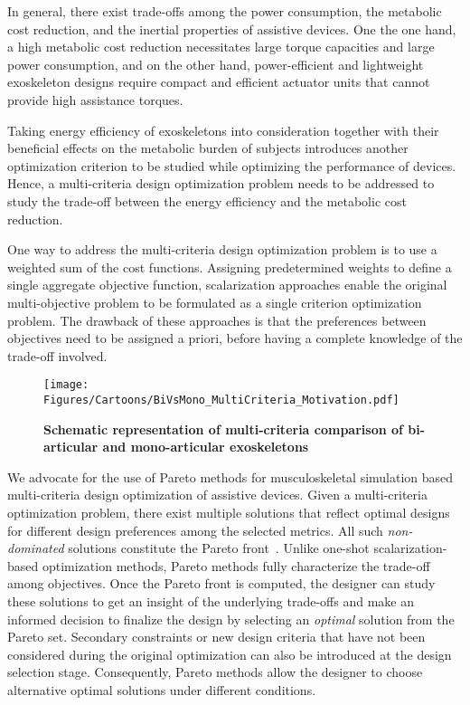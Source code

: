 \documentclass[10pt,letterpaper]{article}
\begin{document}
In general, there exist  trade-offs among the power consumption, the metabolic cost reduction, and the inertial properties of assistive devices. One the one hand, a high metabolic cost reduction necessitates large torque capacities and large power consumption, and on the other hand, power-efficient and lightweight exoskeleton designs require compact and efficient actuator units that cannot provide high assistance torques.

Taking energy efficiency of exoskeletons into consideration together with their beneficial effects on the metabolic burden of subjects introduces another optimization criterion to be studied while optimizing the performance of devices. Hence, a multi-criteria design optimization problem needs to be addressed to study the trade-off between the energy efficiency and the metabolic cost reduction.

One way to address the  multi-criteria design optimization problem is to use a weighted sum of the cost functions. Assigning predetermined weights to define a single aggregate objective function, scalarization approaches enable the original multi-objective problem to be formulated as a single
criterion optimization problem. The drawback of these approaches is that the preferences between objectives need to be assigned a priori, before having a complete knowledge of the trade-off involved.

\begin{figure}[b!]
	\texttt{[image: Figures/Cartoons/BiVsMono\_MultiCriteria\_Motivation.pdf]}
	\caption{\small{\textbf{Schematic representation of multi-criteria comparison of bi-articular and mono-articular exoskeletons}}}
	\label{Fig_Multicriteria_Comparison}
\end{figure}

We advocate for the use of Pareto methods for musculoskeletal simulation based multi-criteria design optimization of assistive devices. Given a multi-criteria optimization problem, there exist multiple solutions that reflect optimal designs for different design preferences among the selected metrics. All such \emph{non-dominated} solutions constitute the Pareto front~\cite{papalambros_wilde_2000,Marler2010,unalPareto}.  Unlike one-shot scalarization-based optimization methods, Pareto methods fully characterize the trade-off among objectives. Once the Pareto front is computed, the designer can study these solutions to get an insight of the underlying trade-offs and make an informed decision to finalize the design by selecting an \emph{optimal} solution from the Pareto set. Secondary constraints or new design criteria that have not been considered during the original optimization can also be introduced at the design selection stage. Consequently, Pareto methods allow the designer to choose alternative optimal solutions under different conditions.
\end{document}

